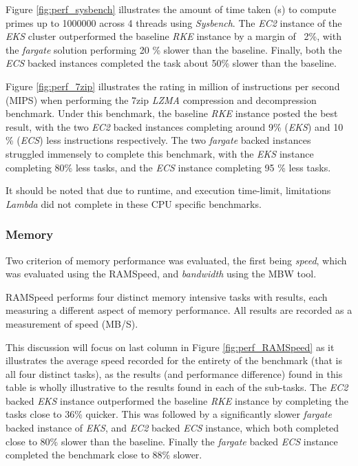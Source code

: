 Figure \ref{fig:perf_sysbench} illustrates the amount of time taken (s) to compute primes up to 1000000 across 4 threads using \textit{Sysbench}.
The \textit{EC2} instance of the \textit{EKS} cluster outperformed the baseline \textit{RKE} instance by a margin of ~2\%,
with the \textit{fargate} solution performing 20 \% slower than the baseline.
Finally, both the \textit{ECS} backed instances completed the task about 50\% slower than the baseline. 

Figure \ref{fig:perf_7zip} illustrates the rating in million of instructions per second (MIPS) when performing the 7zip \textit{LZMA} compression and decompression benchmark.
Under this benchmark, the baseline \textit{RKE} instance posted the best result, with the two \textit{EC2} backed instances completing around 9\% (\textit{EKS}) and 10 \% (\textit{ECS}) less instructions respectively.
The two \textit{fargate} backed instances struggled immensely to complete this benchmark,
with the \textit{EKS} instance completing 80\% less tasks, and the \textit{ECS} instance completing 95 \% less tasks.

\noindent \newline It should be noted that due to runtime, and execution time-limit, limitations \textit{Lambda} did not complete in these CPU specific benchmarks.

\subsubsection{Memory}
Two criterion of memory performance was evaluated, the first being \emph{speed},
which was evaluated using the RAMSpeed, and \emph{bandwidth} using the MBW tool.

RAMSpeed performs four distinct memory intensive tasks with results, each measuring a different aspect of memory performance.
All results are recorded as a measurement of speed (MB/S).

This discussion will focus on last column in Figure \ref{fig:perf_RAMSpeed} as it illustrates the average speed recorded for the entirety of the benchmark (that is all four distinct tasks),
as the results (and performance difference) found in this table is wholly illustrative to the results found in each of the sub-tasks.
The \textit{EC2} backed \textit{EKS} instance outperformed the baseline \textit{RKE} instance by completing the tasks close to 36\% quicker.
This was followed by a significantly slower \textit{fargate} backed instance of \textit{EKS}, and \textit{EC2} backed \textit{ECS} instance,
which both completed close to 80\% slower than the baseline.
Finally the \textit{fargate} backed \textit{ECS} instance completed the benchmark close to 88\% slower.

